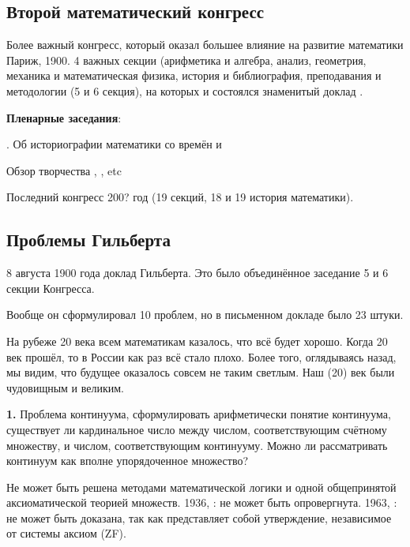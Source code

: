 \documentclass[a4paper,oneside,fleqn,10pt]{article}
\begin{document}
\subsection{Второй математический конгресс}

Более важный конгресс, который оказал большее влияние на развитие математики Париж, 1900.
4 важных секции (арифметика и алгебра, анализ, геометрия, механика и математическая физика, история
и библиография, преподавания и методологии (5 и 6 секция), на которых и состоялся знаменитый доклад .

\textbf{Пленарные заседания}:

\begin{items}{-2}
\item {}. Об историографии математики со времён  и 
\item {} Обзор творчества , , etc
\item {}
\end{items}

Последний конгресс 200? год (19 секций, 18 и 19 история математики).

\subsection{Проблемы Гильберта}

8 августа 1900 года  доклад Гильберта.
Это было объединённое заседание 5 и 6 секции Конгресса.

Вообще он сформулировал 10 проблем, но в письменном докладе было 23 штуки.

На рубеже 20 века всем математикам казалось, что всё будет хорошо. Когда 20 век прошёл,
то в России как раз всё стало плохо. Более того, оглядываясь назад, мы видим, что будущее
оказалось совсем не таким светлым. Наш (20) век были чудовищным и великим.

\medskip

\textbf{1.} Проблема континуума, сформулировать арифметически понятие континуума,
существует ли кардинальное число между числом, соответствующим счётному множеству, и числом,
соответствующим континууму. Можно ли рассматривать континуум как вполне упорядоченное множество?

Не может быть решена методами математической логики и одной общепринятой
аксиоматической теорией множеств. 1936, : не может быть опровергнута.
1963, : не может быть доказана, так как представляет собой утверждение,
независимое от системы аксиом   (ZF).
\end{document}
